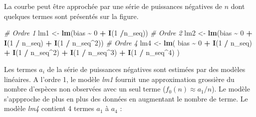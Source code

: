 \documentclass[
  11pt,
  american,
  a4paper,
  extrafontsizes,onecolumn,openright
  ]{memoir}
\newenvironment{Shaded}{\begin{snugshade}}{\end{snugshade}}
\newcommand{\CommentTok}[1]{\textcolor[rgb]{0.56,0.35,0.01}{\textit{#1}}}
\newcommand{\DecValTok}[1]{\textcolor[rgb]{0.00,0.00,0.81}{#1}}
\newcommand{\FunctionTok}[1]{\textcolor[rgb]{0.13,0.29,0.53}{\textbf{#1}}}
\newcommand{\NormalTok}[1]{#1}
\newcommand{\OtherTok}[1]{\textcolor[rgb]{0.56,0.35,0.01}{#1}}
\newcommand{\SpecialCharTok}[1]{\textcolor[rgb]{0.81,0.36,0.00}{\textbf{#1}}}
\begin{document}
La courbe peut être approchée par une série de puissances négatives de \(n\) dont quelques termes sont présentés sur la figure.

\scriptsize

\begin{Shaded}
\begin{Highlighting}[]
\CommentTok{\# Ordre 1}
\NormalTok{lm1 }\OtherTok{\textless{}{-}} \FunctionTok{lm}\NormalTok{(bias }\SpecialCharTok{\textasciitilde{}} \DecValTok{0} \SpecialCharTok{+} \FunctionTok{I}\NormalTok{(}\DecValTok{1}  \SpecialCharTok{/}\NormalTok{n\_seq))}
\CommentTok{\# Ordre 2}
\NormalTok{lm2 }\OtherTok{\textless{}{-}} \FunctionTok{lm}\NormalTok{(bias }\SpecialCharTok{\textasciitilde{}} \DecValTok{0} \SpecialCharTok{+} \FunctionTok{I}\NormalTok{(}\DecValTok{1} \SpecialCharTok{/}\NormalTok{ n\_seq) }\SpecialCharTok{+} \FunctionTok{I}\NormalTok{(}\DecValTok{1} \SpecialCharTok{/}\NormalTok{ n\_seq}\SpecialCharTok{\^{}}\DecValTok{2}\NormalTok{))}
\CommentTok{\# Ordre 4}
\NormalTok{lm4 }\OtherTok{\textless{}{-}} \FunctionTok{lm}\NormalTok{(}
\NormalTok{  bias }\SpecialCharTok{\textasciitilde{}} \DecValTok{0} \SpecialCharTok{+} \FunctionTok{I}\NormalTok{(}\DecValTok{1} \SpecialCharTok{/}\NormalTok{ n\_seq) }\SpecialCharTok{+} \FunctionTok{I}\NormalTok{(}\DecValTok{1} \SpecialCharTok{/}\NormalTok{ n\_seq}\SpecialCharTok{\^{}}\DecValTok{2}\NormalTok{) }\SpecialCharTok{+} \FunctionTok{I}\NormalTok{(}\DecValTok{1} \SpecialCharTok{/}\NormalTok{ n\_seq}\SpecialCharTok{\^{}}\DecValTok{3}\NormalTok{) }\SpecialCharTok{+} \FunctionTok{I}\NormalTok{(}\DecValTok{1} \SpecialCharTok{/}\NormalTok{ n\_seq}\SpecialCharTok{\^{}}\DecValTok{4}\NormalTok{)}
\NormalTok{)}
\end{Highlighting}
\end{Shaded}

\normalsize

Les termes \(a_i\) de la série de puissances négatives sont estimées par des modèles linéaires.
A l'ordre 1, le modèle \emph{lm1} fournit une approximation grossière du nombre d'espèces non observées avec un seul terme (\(f_0(n) \approx a_1 / n\)).
Le modèle s'appproche de plus en plus des données en augmentant le nombre de terme.
Le modèle \emph{lm4} contient 4 termes \(a_1\) à \(a_4\) :

\scriptsize

\begin{Shaded}
\end{Shaded}
\end{document}
